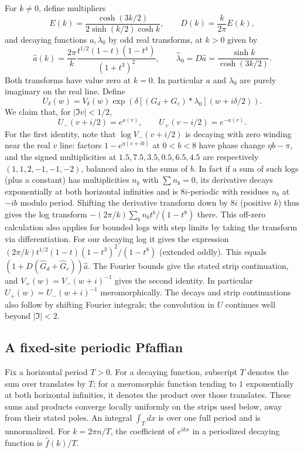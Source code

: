 For $k\ne0$, define multipliers
\[
E(k)=\frac{\cosh(3k/2)}{2\sinh(k/2)\cosh k},\qquad D(k)=\frac{k}{2\pi}E(k),
\]
and decaying functions $a,\lambda_0$ by odd real transforms, at $k>0$ given by
\[
\widehat a(k)=\frac{2\pi}{k}\frac{t^{1/2}(1-t)(1-t^4)}{(1+t^3)^2},\qquad
 \widehat\lambda_0=D\widehat a=\frac{\sinh k}{\cosh(3k/2)}.
\]
Both transforms have value zero at $k=0$. In particular $a$ and $\lambda_0$ are purely imaginary on the real line.
Define
\[
U_\delta(w)=V_\delta(w)\exp\!\left(\delta[(G_d+G_c)*\lambda_0](w+i\delta/2)\right).
\]
We claim that, for $|\Im v|<1/2$,
\[
U_-(v+i/2)=e^{a(v)},\qquad U_+(v-i/2)=e^{-a(v)}.
\]
For the first identity, note that $\log V_-(v+i/2)$ is decaying with zero winding near the real $v$ line: factors $1-e^{\eta(v+i b)}$ at $0<b<8$ have phase change $\eta b-\pi$, and the signed multiplicities at $1.5,7.5,3.5,0.5,6.5,4.5$ are respectively $(1,1,2,-1,-1,-2)$, balanced also in the sums of $b$. In fact if a sum of such logs (plus a constant) has multiplicities $n_b$ with $\sum n_b=0$, its derivative decays exponentially at both horizontal infinities and is $8i$-periodic with residues $n_b$ at $-ib$ modulo period. Shifting the derivative transform down by $8i$ (positive $k$) thus gives the log transform $-(2\pi/k)\sum_b n_b t^b/(1-t^8)$ there. This off-zero calculation also applies for bounded logs with step limits by taking the transform via differentiation. For our decaying log it gives the expression $(2\pi/k)t^{1/2}(1-t)(1-t^3)^2/(1-t^8)$ (extended oddly). This equals $(1+D(\widehat G_d+\widehat G_c))\widehat a$. The Fourier bounds give the stated strip continuation, and $V_+(w)=V_-(w+i)^{-1}$ gives the second identity. In particular
$U_+(w)=U_-(w+i)^{-1}$ meromorphically. The decays and strip continuations also follow by shifting Fourier integrals; the convolution in $U$ continues well beyond $|\Im|<2$.

\subsection{A fixed-site periodic Pfaffian}

Fix a horizontal period $T>0$. For a decaying function, subscript $T$ denotes the sum over translates by $T$; for a meromorphic function tending to $1$ exponentially at both horizontal infinities, it denotes the product over those translates. These sums and products converge locally uniformly on the strips used below, away from their stated poles. An integral $\int_T dx$ is over one full period and is unnormalized. For $k=2\pi n/T$, the coefficient of $e^{ikx}$ in a periodized decaying function is $\widehat f(k)/T$.

